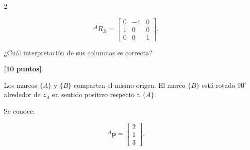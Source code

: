 \documentclass[10pt]{article}
\begin{document}
\begin{multicols}{2}
\begin{question}
            \[
            {}^A R_B=
            \begin{bmatrix}
                0 & -1 & 0\\
                1 &  0 & 0\\
                0 &  0 & 1
            \end{bmatrix}.
            \]

            ¿Cuál interpretación de sus columnas es correcta?

            \begin{answers}



            \end{answers}
        \end{question}






        \begin{question}
            \textbf{[10 puntos]}

            Los marcos \(\{A\}\) y \(\{B\}\) comparten el mismo origen.
            El marco \(\{B\}\) está rotado \(90^\circ\) alrededor de \(z_A\)
            en sentido positivo respecto a \(\{A\}\).

            Se conoce:

            \[
            {}^A\mathbf{p}
            =
            \begin{bmatrix}
                2\\
                1\\
                3
            \end{bmatrix}.
            \]


\end{question}
\end{multicols}
\end{document}
